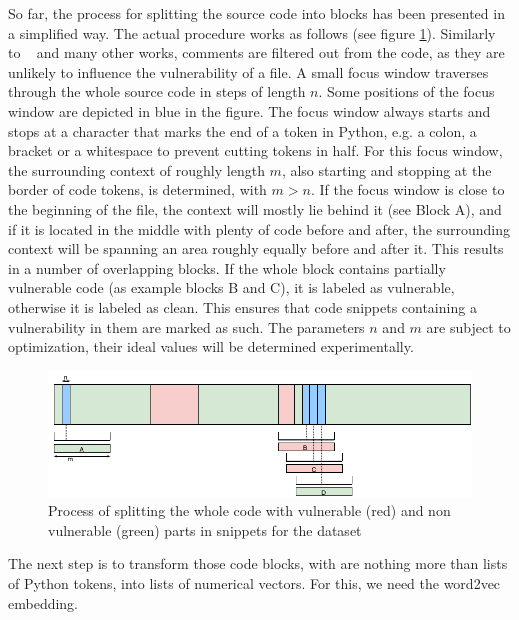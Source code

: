 \documentclass[
	a4paper,
	pagesize,
	pdftex,
	12pt,
	twoside, %
	BCOR=5mm, %
	ngerman,
	fleqn,
	final,
	]{scrartcl}
\begin{document}
So far, the process for splitting the source code into blocks has been presented in a simplified way. The actual procedure works as follows (see figure \ref{fig:FocusBlocks}).
Similarly to ~\cite{Hovsepyan.2012} and many other works, comments are filtered out from the code, as they are unlikely to influence the vulnerability of a file. A small focus window traverses through the whole source code in steps of length $n$. Some positions of the focus window are depicted in blue in the figure. The focus window always starts and stops at a character that marks the end of a token in Python, e.g. a colon, a bracket or a whitespace to prevent cutting tokens in half. For this focus window, the surrounding context of roughly length $m$, also starting and stopping at the border of code tokens, is determined, with $m > n$. If the focus window is close to the beginning of the file, the context will mostly lie behind it (see Block A), and if it is located in the middle with plenty of code before and after, the surrounding context will be spanning an area roughly equally before and after it. This results in a number of overlapping blocks. If the whole block contains partially vulnerable code (as example blocks B and C), it is labeled as vulnerable, otherwise it is labeled as clean. This ensures that code snippets containing a vulnerability in them are marked as such. The parameters $n$ and $m$ are subject to optimization, their ideal values will be determined experimentally.

\begin{figure}[ht]
	\centering
	\includegraphics[width=0.9\linewidth]{img/FocusBlocks}
	\caption{Process of splitting the whole code with vulnerable (red) and non vulnerable (green) parts in snippets for the dataset}
	\label{fig:FocusBlocks}
\end{figure}

The next step is to transform those code blocks, with are nothing more than lists of Python tokens, into lists of numerical vectors. For this, we need the word2vec embedding. 
\end{document}
